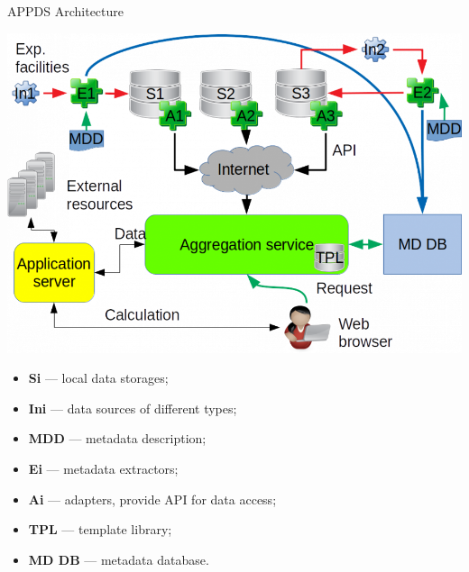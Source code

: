 \begin{frame}{APPDS Architecture}
\begin{minipage}[c]{0.63\textwidth}
  \includegraphics[width=1\textwidth]{pics/arch_appds.png}
\end{minipage}
\hfill
\begin{minipage}[c]{0.36\textwidth}
  \small
  \begin{itemize}
    \setlength{\itemsep}{0pt}
    \item\textbf{Si} — local data storages;
    \item\textbf{Ini} — data sources of different types;
    \item\textbf{MDD} — metadata description;
    \item\textbf{Ei} — metadata extractors;
    \item\textbf{Ai} — adapters, provide API for data access;
    \item\textbf{TPL} — template library;
    \item\textbf{MD DB} — metadata database.
  \end{itemize}
\end{minipage}
\end{frame}
